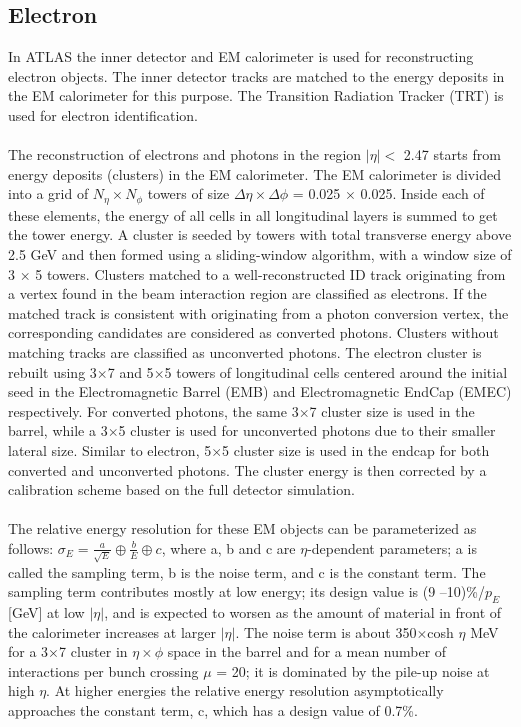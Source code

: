 \subsection{Electron}
In ATLAS the inner detector and EM calorimeter is used for reconstructing electron objects. The inner detector tracks are matched to the energy deposits in the EM calorimeter for this purpose. The Transition Radiation Tracker (TRT) is used for electron identification. 
\paragraph{}
The reconstruction of electrons and photons in the region $|\eta| <$ 2.47 starts from energy deposits (clusters) in the EM calorimeter. The EM calorimeter is divided into a grid of $N_{\eta} \times N_{\phi}$ towers of size $\Delta \eta \times \Delta \phi$ = 0.025 $\times$ 0.025. Inside each of these elements, the energy of all cells in all longitudinal layers is summed to get the tower energy. A cluster is seeded by towers with total transverse energy above 2.5 GeV and then formed using a sliding-window algorithm, with a window size of 3 × 5 towers. Clusters matched to a well-reconstructed ID track originating from a vertex found in the beam interaction region are classified as electrons. 
If the matched track is consistent with originating from a photon conversion vertex, the corresponding candidates are considered as converted photons. Clusters without matching tracks are classified as unconverted photons. 
The electron cluster is rebuilt using 3$\times$7 and 5$\times$5 towers of longitudinal cells centered around the initial seed in the Electromagnetic Barrel (EMB) and Electromagnetic EndCap (EMEC) respectively. 
For converted photons, the same 3$\times$7 cluster size is used in the barrel, while a 3$\times$5 cluster is used for unconverted photons due to their smaller lateral size. Similar to electron, 5$\times$5 cluster size is used in the endcap for both converted and unconverted photons. The cluster energy is then corrected by a calibration scheme based on the full detector simulation.
\paragraph{}

The relative energy resolution for these EM objects can be parameterized as follows: 
$\sigma_{E} = \frac{a}{\sqrt{E}}\oplus \frac{b}{E}  \oplus c$, 
where a, b and c are $\eta$-dependent parameters; a is called the sampling term, b is the noise term, and c is the constant term. The sampling term contributes mostly at low energy; its design value is (9 --10)\%/${p_{E}} $[GeV] at low $|\eta|$, and is expected to worsen as the amount of material in front of the calorimeter increases at larger $|\eta|$. The noise term is about 350$\times$cosh $\eta$ MeV for a 3$\times$7 cluster in  $\eta \times \phi$  space in the barrel and for a mean number of interactions per bunch crossing $\mu$ = 20; it is dominated by the pile-up noise at high $\eta$. At higher energies the relative energy resolution  asymptotically approaches the constant term, c, which has a design value of 0.7\%.

